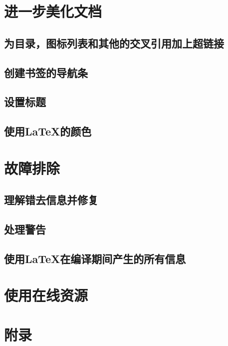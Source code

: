 \documentclass{book}
\begin{document}
\chapter{进一步美化文档}
	\section{为目录，图标列表和其他的交叉引用加上超链接}
	\section{创建书签的导航条}
	\section{设置标题}
	\section{使用LaTeX的颜色}
\chapter{故障排除}
	\section{理解错去信息并修复}
	\section{处理警告}
	\section{使用LaTeX在编译期间产生的所有信息}
\chapter{使用在线资源}
\chapter{附录}
\end{document}
